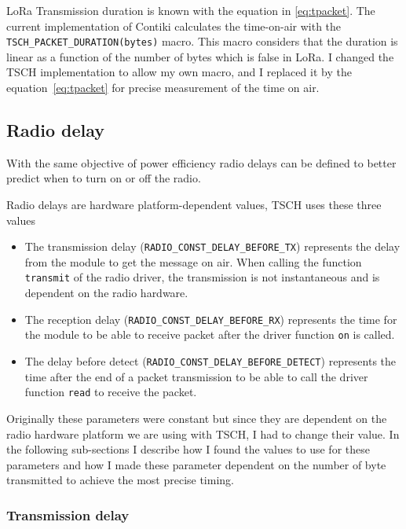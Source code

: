 LoRa Transmission duration is known with the equation in \ref{eq:tpacket}.
The current implementation of Contiki calculates the time-on-air with the
\lstinline{TSCH_PACKET_DURATION(bytes)} macro.
This macro considers that the duration is linear as a function of the
number of bytes which is false in LoRa.
I changed the TSCH implementation to allow my own macro, and
I replaced it by the equation~\ref{eq:tpacket} for precise measurement
of the time on air.

\subsection{Radio delay}

With the same objective of power efficiency radio delays can be defined
to better predict when to turn on or off the radio.

Radio delays are hardware platform-dependent values, TSCH uses these three values

\begin{itemize}
  \item The transmission delay (\lstinline{RADIO_CONST_DELAY_BEFORE_TX})
    represents the delay from the module to get the message on air.
    When calling the function \lstinline{transmit} of the radio driver,
    the transmission is not instantaneous and is dependent on the radio
    hardware.
  \item The reception delay (\lstinline{RADIO_CONST_DELAY_BEFORE_RX})
    represents the time for the module to be able to receive packet after the
    driver function \lstinline{on} is called.
  \item The delay before detect (\lstinline{RADIO_CONST_DELAY_BEFORE_DETECT})
    represents the time after the end of a packet transmission to be able to
    call the driver function \lstinline{read} to receive the packet.
\end{itemize}

Originally these parameters were constant but since they are dependent on the
radio hardware platform we are using with TSCH, I had to change their value.
In the following sub-sections I describe how I found the values to use for these
parameters and how I made these parameter dependent on the number of byte
transmitted to achieve the most precise timing.

\subsubsection{Transmission delay}

